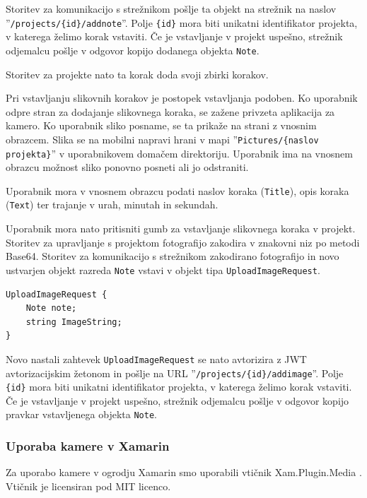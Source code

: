 \documentclass[a4paper, 12pt]{book}
\begin{document}
Storitev za komunikacijo s strežnikom pošlje ta objekt na strežnik na naslov ''\texttt{/projects/\{id\}/addnote}''.
Polje \texttt{\{id\}} mora biti unikatni identifikator projekta, v katerega želimo korak vstaviti.
Če je vstavljanje v projekt uspešno, strežnik odjemalcu pošlje v odgovor kopijo dodanega objekta \texttt{Note}.

Storitev za projekte nato ta korak doda svoji zbirki korakov.

Pri vstavljanju slikovnih korakov je postopek vstavljanja podoben.
Ko uporabnik odpre stran za dodajanje slikovnega koraka, se zažene privzeta aplikacija za kamero.
Ko uporabnik sliko posname, se ta prikaže na strani z vnosnim obrazcem.
Slika se na mobilni napravi hrani v mapi ''\texttt{Pictures/\{naslov projekta\}}'' v uporabnikovem domačem direktoriju.
Uporabnik ima na vnosnem obrazcu možnost sliko ponovno posneti ali jo odstraniti.

Uporabnik mora v vnosnem obrazcu podati naslov koraka (\texttt{Title}), opis koraka (\texttt{Text}) ter trajanje v urah, minutah in sekundah.

Uporabnik mora nato pritisniti gumb za vstavljanje slikovnega koraka v projekt.
Storitev za upravljanje s projektom fotografijo zakodira v znakovni niz po metodi Base64.
Storitev za komunikacijo s strežnikom zakodirano fotografijo in novo ustvarjen objekt razreda \texttt{Note} vstavi v objekt tipa \texttt{UploadImageRequest}.

\begin{Verbatim}[commandchars=+\[\]]
UploadImageRequest {
    Note note;
    string ImageString; 
}
\end{Verbatim}

Novo nastali zahtevek \texttt{UploadImageRequest} se nato avtorizira z JWT avtorizacijskim žetonom in pošlje na URL ''\texttt{/projects/\{id\}/addimage}''.
Polje \texttt{\{id\}} mora biti unikatni identifikator projekta, v katerega želimo korak vstaviti.
Če je vstavljanje v projekt uspešno, strežnik odjemalcu pošlje v odgovor kopijo pravkar vstavljenega objekta \texttt{Note}.


\subsubsection{Uporaba kamere v Xamarin}


Za uporabo kamere v ogrodju Xamarin smo uporabili vtičnik Xam.Plugin.Media \cite{xampluginmedia}.
Vtičnik je licensiran pod MIT licenco.
\end{document}
